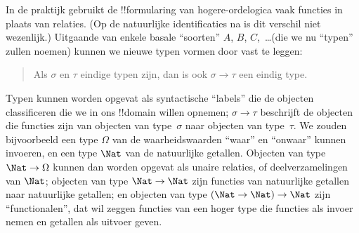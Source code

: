 \documentclass[openany]{memoir}
\begin{document}
In de praktijk gebruikt de !!{formula}ring van hogere-ordelogica vaak functies
in plaats van relaties. (Op de natuurlijke identificaties na is dit verschil
niet wezenlijk.) Uitgaande van enkele basale ``soorten'' $A$, $B$,
$C$,~\dots (die we nu ``typen'' zullen noemen) kunnen we nieuwe typen vormen
door vast te leggen:
\begin{quote}
Als $\sigma$ en $\tau$ eindige typen zijn, dan is ook $\sigma \to \tau$ een
eindig type.
\end{quote}
Typen kunnen worden opgevat als syntactische ``labels'' die de objecten
classificeren die we in ons !!{domain} willen opnemen; $\sigma \to \tau$
beschrijft de objecten die functies zijn van objecten van type~$\sigma$ naar
objecten van type~$\tau$. We zouden bijvoorbeeld een type $\Omega$ van de
waarheidswaarden ``waar'' en ``onwaar'' kunnen invoeren, en een type $\Nat$ van
de natuurlijke getallen. Objecten van type $\Nat \to \Omega$ kunnen dan worden
opgevat als unaire relaties, of deelverzamelingen van $\Nat$; objecten van type
$\Nat \to \Nat$ zijn functies van natuurlijke getallen naar natuurlijke
getallen; en objecten van type $(\Nat \to \Nat) \to \Nat$ zijn
``functionalen'', dat wil zeggen functies van een hoger type die functies als
invoer nemen en getallen als uitvoer geven.
\end{document}
